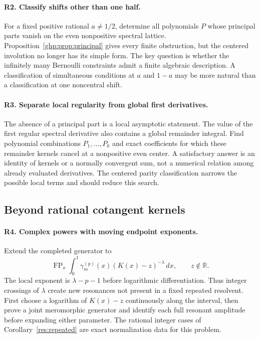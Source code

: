 \documentclass[11pt,a4paper]{article}
\numberwithin{equation}{section}
\theoremstyle{definition}
\theoremstyle{remark}
\begin{document}
\paragraph{R2. Classify shifts other than one half.}
For a fixed positive rational $a\ne1/2$, determine all
polynomials $P$ whose principal parts vanish on the even
nonpositive spectral lattice. Proposition~\ref{ghp:prop:principal}
gives every finite obstruction, but the centered involution
no longer has its simple form. The key question is whether
the infinitely many Bernoulli constraints admit a finite
algebraic description. A classification of simultaneous
conditions at $a$ and $1-a$ may be more natural than a
classification at one noncentral shift.

\paragraph{R3. Separate local regularity from global first derivatives.}
The absence of a principal part is a local asymptotic
statement. The value of the first regular spectral
derivative also contains a global remainder integral.
Find polynomial combinations $P_1,\ldots,P_k$ and exact
coefficients for which these remainder kernels cancel
at a nonpositive even center. A satisfactory answer is
an identity of kernels or a normally convergent sum,
not a numerical relation among already evaluated
derivatives. The centered parity classification narrows
the possible local terms and should reduce this search.

\subsection{Beyond rational cotangent kernels}

\paragraph{R4. Complex powers with moving endpoint exponents.}
Extend the completed generator to
\[
 \operatorname{FP}_x\int_0^1
     \gamma_m^{(p)}(x)(K(x)-z)^{-\lambda}\,dx,
 \qquad z\notin\mathbb R.
\]
The local exponent is $\lambda-p-1$ before logarithmic
differentiation. Thus integer crossings of $\lambda$
create new resonances not present in a fixed repeated
resolvent. First choose a logarithm of $K(x)-z$
continuously along the interval, then prove a joint
meromorphic generator and identify each full resonant
amplitude before expanding either parameter. The rational
integer cases of Corollary~\ref{res:repeated} are exact
normalization data for this problem.
\end{document}
